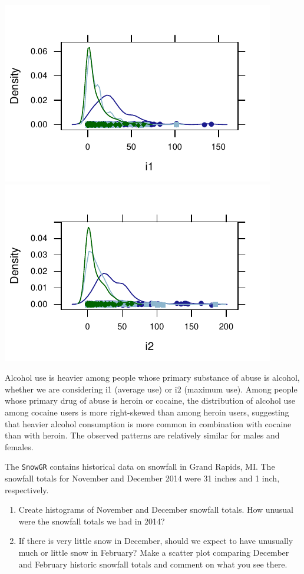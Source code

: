 \documentclass[twoside]{book}\usepackage[]{graphicx}\usepackage[]{xcolor}
\makeatletter
\def\maxwidth{ %
  \ifdim\Gin@nat@width>\linewidth
    \linewidth
  \else
    \Gin@nat@width
  \fi
}
\newenvironment{knitrout}{}{} %
\newcommand{\Rindex}[1]{\index{\texttt{#1}}}
\newcommand{\dataframe}[1]{{\color{blue!80!black}\texttt{#1}}\Rindex{#1}}
\makeatother
\begin{document}
\begin{solution}
\begin{knitrout}
{\centering \includegraphics[width=\maxwidth]{figures/fig-unnamed-chunk-36-1} 
\includegraphics[width=\maxwidth]{figures/fig-unnamed-chunk-36-2} 

}



\end{knitrout}
Alcohol use is heavier among people whose primary substance of abuse is alcohol, whether we are considering i1 (average use) or i2 (maximum use). Among people whose primary drug of abuse is heroin or cocaine, the distribution of alcohol use among cocaine users is more right-skewed than among heroin users, suggesting that heavier alcohol consumption is more common in combination with cocaine than with heroin.  The observed patterns are relatively similar for males and females.
\end{solution}

\begin{problem}
	The \dataframe{SnowGR} contains historical data on snowfall in Grand Rapids, MI.
	The snowfall totals for November and December 2014 were 31 inches and 1 inch, respectively.
	\begin{enumerate}
		\item
			Create histograms of November and December snowfall totals.  How unusual were the snowfall totals we had in 2014?
		\item
			If there is very little snow in December, should we expect to have unusually much
			or little snow in February?  Make a scatter plot comparing December and February
			historic snowfall totals and comment on what you see there.
	\end{enumerate}
\end{problem}
\end{document}
